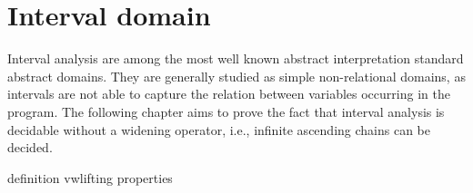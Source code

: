 \section{Interval domain}\label{sec:intervals}

Interval analysis are among the most well known abstract
interpretation standard abstract domains. They are generally studied
as simple non-relational domains, as intervals are not able to capture
the relation between variables occurring in the program.  The
following chapter aims to prove the fact that interval analysis is
decidable without a widening operator, i.e., infinite ascending chains
can be decided.

{definition}
{vwlifting}
{properties}
